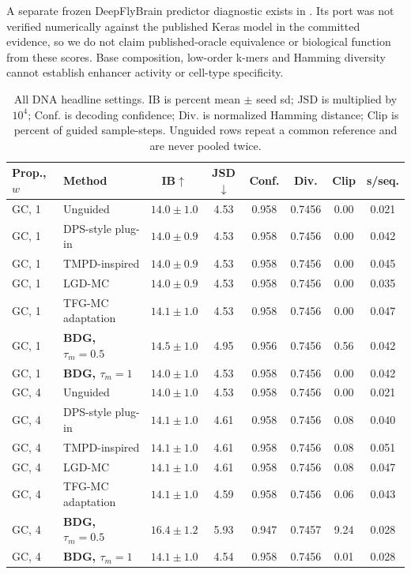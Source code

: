 \documentclass{article}
\begin{document}
A separate frozen DeepFlyBrain predictor diagnostic exists in . Its port was not verified numerically against the published Keras model in the committed evidence, so we do not claim published-oracle equivalence or biological function from these scores. Base composition, low-order k-mers and Hamming diversity cannot establish enhancer activity or cell-type specificity.
\begin{table}[!htbp]
\centering\small
\caption{All DNA headline settings. IB is percent mean $\pm$ seed sd; JSD is multiplied by $10^4$; Conf. is decoding confidence; Div. is normalized Hamming distance; Clip is percent of guided sample-steps. Unguided rows repeat a common reference and are never pooled twice.}
\label{tab:full-m2}
\begin{tabular}{llcccccc}
\toprule
Prop., $w$ & Method & IB$\uparrow$ & JSD$\downarrow$ & Conf. & Div. & Clip & s/seq.\\
\midrule
GC, 1 & Unguided & $14.0\pm1.0$ & 4.53 & 0.958 & 0.7456 & 0.00 & 0.021\\
GC, 1 & DPS-style plug-in & $14.0\pm0.9$ & 4.53 & 0.958 & 0.7456 & 0.00 & 0.042\\
GC, 1 & TMPD-inspired & $14.0\pm0.9$ & 4.53 & 0.958 & 0.7456 & 0.00 & 0.045\\
GC, 1 & LGD-MC & $14.0\pm0.9$ & 4.53 & 0.958 & 0.7456 & 0.00 & 0.035\\
GC, 1 & TFG-MC adaptation & $14.1\pm1.0$ & 4.53 & 0.958 & 0.7456 & 0.00 & 0.047\\
GC, 1 & \textbf{BDG, $\tau_m=0.5$} & $14.5\pm1.0$ & 4.95 & 0.956 & 0.7456 & 0.56 & 0.042\\
GC, 1 & \textbf{BDG, $\tau_m=1$} & $14.0\pm1.0$ & 4.53 & 0.958 & 0.7456 & 0.00 & 0.042\\
\midrule
GC, 4 & Unguided & $14.0\pm1.0$ & 4.53 & 0.958 & 0.7456 & 0.00 & 0.021\\
GC, 4 & DPS-style plug-in & $14.1\pm1.0$ & 4.61 & 0.958 & 0.7456 & 0.08 & 0.040\\
GC, 4 & TMPD-inspired & $14.1\pm1.0$ & 4.61 & 0.958 & 0.7456 & 0.08 & 0.051\\
GC, 4 & LGD-MC & $14.1\pm1.0$ & 4.61 & 0.958 & 0.7456 & 0.08 & 0.047\\
GC, 4 & TFG-MC adaptation & $14.1\pm1.0$ & 4.59 & 0.958 & 0.7456 & 0.06 & 0.043\\
GC, 4 & \textbf{BDG, $\tau_m=0.5$} & $16.4\pm1.2$ & 5.93 & 0.947 & 0.7457 & 9.24 & 0.028\\
GC, 4 & \textbf{BDG, $\tau_m=1$} & $14.1\pm1.0$ & 4.54 & 0.958 & 0.7456 & 0.01 & 0.028\\

\end{tabular}
\end{table}
\end{document}
